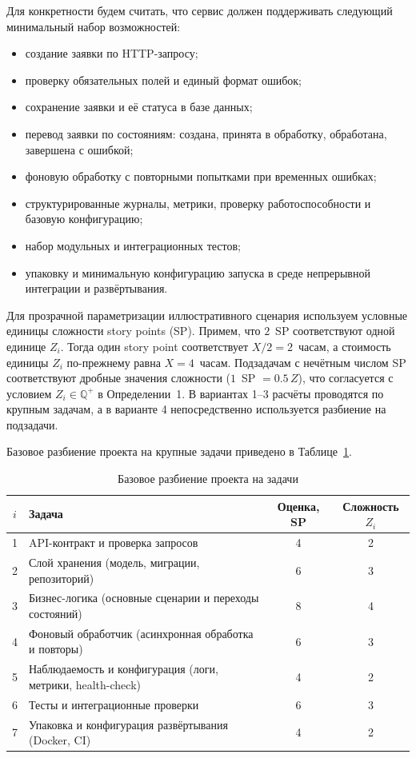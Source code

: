 \documentclass[12pt,a4paper]{article}
\theoremstyle{definition}
\begin{document}
Для конкретности будем считать, что сервис должен поддерживать следующий минимальный набор возможностей:
\begin{itemize}
  \item создание заявки по HTTP-запросу;
  \item проверку обязательных полей и единый формат ошибок;
  \item сохранение заявки и её статуса в базе данных;
  \item перевод заявки по состояниям: создана, принята в обработку, обработана, завершена с ошибкой;
  \item фоновую обработку с повторными попытками при временных ошибках;
  \item структурированные журналы, метрики, проверку работоспособности и базовую конфигурацию;
  \item набор модульных и интеграционных тестов;
  \item упаковку и минимальную конфигурацию запуска в среде непрерывной интеграции и развёртывания.
\end{itemize}

Для прозрачной параметризации иллюстративного сценария используем условные единицы сложности story points (SP). Примем, что $2$~SP соответствуют одной единице $Z_i$. Тогда один story point соответствует $X/2 = 2$~часам, а стоимость единицы $Z_i$ по-прежнему равна $X = 4$~часам. Подзадачам с нечётным числом SP соответствуют дробные значения сложности ($1$~SP $= 0.5\,Z$), что согласуется с условием $Z_i \in \mathbb{Q}^{+}$ в Определении~1. В вариантах 1--3 расчёты проводятся по крупным задачам, а в варианте 4 непосредственно используется разбиение на подзадачи.

Базовое разбиение проекта на крупные задачи приведено в Таблице~\ref{tab:practical-baseline}.

\begin{table}[ht!]
\centering
\caption{Базовое разбиение проекта на задачи}
\label{tab:practical-baseline}
\begin{tabularx}{\textwidth}{@{}c>{\raggedright\arraybackslash}Xcc@{}}
\toprule
$i$ & Задача & Оценка, SP & Сложность $Z_i$ \\
\midrule
1 & API-контракт и проверка запросов & 4 & 2 \\
2 & Слой хранения (модель, миграции, репозиторий) & 6 & 3 \\
3 & Бизнес-логика (основные сценарии и переходы состояний) & 8 & 4 \\
4 & Фоновый обработчик (асинхронная обработка и повторы) & 6 & 3 \\
5 & Наблюдаемость и конфигурация (логи, метрики, health-check) & 4 & 2 \\
6 & Тесты и интеграционные проверки & 6 & 3 \\
7 & Упаковка и конфигурация развёртывания (Docker, CI) & 4 & 2 \\
\bottomrule
\end{tabularx}
\end{table}
\end{document}
